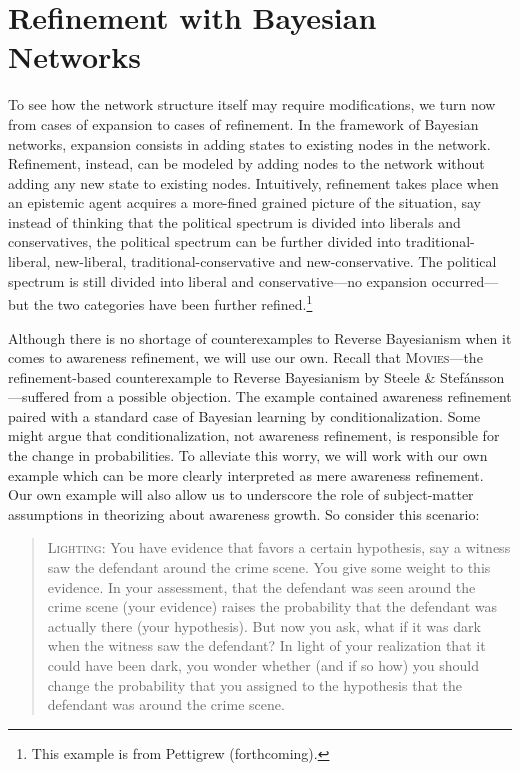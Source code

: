 \documentclass[
  11pt,
  dvipsnames,enabledeprecatedfontcommands]{scrartcl}
\begin{document}
\hypertarget{refinement-with-bayesian-networks}{%
\section{Refinement with Bayesian
Networks}\label{refinement-with-bayesian-networks}}

\label{sec:structural-both}

To see how the network structure itself may require modifications, we
turn now from cases of expansion to cases of refinement. In the
framework of Bayesian networks, expansion consists in adding states to
existing nodes in the network. Refinement, instead, can be modeled by
adding nodes to the network without adding any new state to existing
nodes. Intuitively, refinement takes place when an epistemic agent
acquires a more-fined grained picture of the situation, say instead of
thinking that the political spectrum is divided into liberals and
conservatives, the political spectrum can be further divided into
traditional-liberal, new-liberal, traditional-conservative and
new-conservative. The political spectrum is still divided into liberal
and conservative---no expansion occurred---but the two categories have
been further refined.\footnote{This example is from Pettigrew
  (forthcoming).}

Although there is no shortage of counterexamples to Reverse Bayesianism
when it comes to awareness refinement, we will use our own. Recall that
\textsc{Movies}---the refinement-based counterexample to Reverse
Bayesianism by Steele \& Stefánsson---suffered from a possible
objection. The example contained awareness refinement paired with a
standard case of Bayesian learning by conditionalization. Some might
argue that conditionalization, not awareness refinement, is responsible
for the change in probabilities. To alleviate this worry, we will work
with our own example which can be more clearly interpreted as mere
awareness refinement. Our own example will also allow us to underscore
the role of subject-matter assumptions in theorizing about awareness
growth. So consider this scenario:

\begin{quote}
\textsc{Lighting:} You have evidence that favors a certain hypothesis, say a witness 
saw the defendant around the crime scene. You give some weight to this evidence. 
In your assessment, that the defendant was seen around the crime scene (your evidence) raises the probability that the defendant was actually there (your hypothesis). But now you ask, what if it was dark when the witness saw the defendant? In light of your realization that it could have been dark, you wonder whether (and if so how) you should change the probability that you assigned to the hypothesis that the defendant was around the crime scene.
\end{quote}
\end{document}
